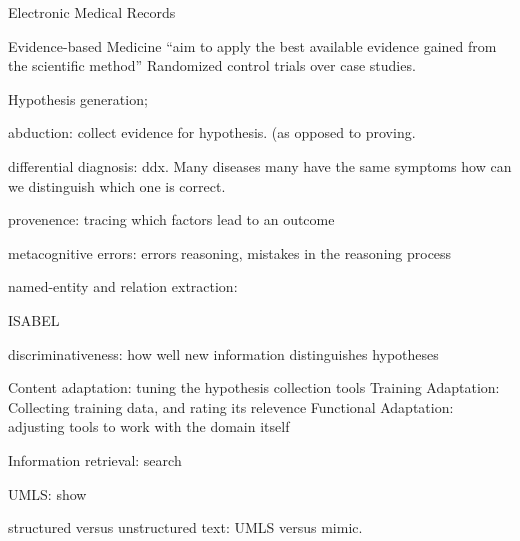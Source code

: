 \documentclass[10pt]{article}
\begin{document}
Electronic Medical Records 

Evidence-based Medicine ``aim to apply the best available evidence gained from the scientific method'' Randomized control trials over case studies. 

Hypothesis generation;

abduction: collect evidence for hypothesis. (as opposed to proving. 

differential diagnosis: ddx. Many diseases many have the same symptoms how can we distinguish which one is correct.

provenence: tracing which factors lead to an outcome 

metacognitive errors: errors reasoning, mistakes in the reasoning process 

named-entity and relation extraction: 

ISABEL

discriminativeness: how well new information distinguishes hypotheses

Content adaptation: tuning the hypothesis collection tools
Training Adaptation:  Collecting training data, and rating its relevence
Functional Adaptation: adjusting tools to work with the domain itself

Information retrieval: search 

UMLS: show

structured versus unstructured text: UMLS versus mimic.
\end{document}
